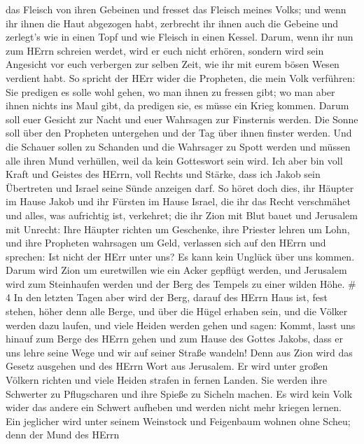 das Fleisch von ihren Gebeinen  und fresset das Fleisch
meines Volks; und wenn ihr ihnen die Haut abgezogen habt, zerbrecht ihr
ihnen auch die Gebeine und zerlegt's wie in einen Topf und wie Fleisch
in einen Kessel.  Darum, wenn ihr nun zum HErrn schreien
werdet, wird er euch nicht erhören, sondern wird sein Angesicht vor euch
verbergen zur selben Zeit, wie ihr mit eurem bösen Wesen verdient habt.
 So spricht der HErr wider die Propheten, die mein Volk
verführen: Sie predigen es solle wohl gehen, wo man ihnen zu fressen
gibt; wo man aber ihnen nichts ins Maul gibt, da predigen sie, es müsse
ein Krieg kommen.  Darum soll euer Gesicht zur Nacht und
euer Wahrsagen zur Finsternis werden. Die Sonne soll über den Propheten
untergehen und der Tag über ihnen finster werden.  Und die
Schauer sollen zu Schanden und die Wahrsager zu Spott werden und müssen
alle ihren Mund verhüllen, weil da kein Gotteswort sein wird.
 Ich aber bin voll Kraft und Geistes des HErrn, voll Rechts
und Stärke, dass ich Jakob sein Übertreten und Israel seine Sünde
anzeigen darf.  So höret doch dies, ihr Häupter im Hause
Jakob und ihr Fürsten im Hause Israel, die ihr das Recht verschmähet und
alles, was aufrichtig ist, verkehret;  die ihr Zion mit
Blut bauet und Jerusalem mit Unrecht:  Ihre Häupter richten
um Geschenke, ihre Priester lehren um Lohn, und ihre Propheten wahrsagen
um Geld, verlassen sich auf den HErrn und sprechen: Ist nicht der HErr
unter uns? Es kann kein Unglück über uns kommen.  Darum
wird Zion um euretwillen wie ein Acker gepflügt werden, und Jerusalem
wird zum Steinhaufen werden und der Berg des Tempels zu einer wilden
Höhe. \# 4  In den letzten Tagen aber wird der Berg, darauf
des HErrn Haus ist, fest stehen, höher denn alle Berge, und über die
Hügel erhaben sein, und die Völker werden dazu laufen,  und
viele Heiden werden gehen und sagen: Kommt, lasst uns hinauf zum Berge
des HErrn gehen und zum Hause des Gottes Jakobs, dass er uns lehre seine
Wege und wir auf seiner Straße wandeln! Denn aus Zion wird das Gesetz
ausgehen und des HErrn Wort aus Jerusalem.  Er wird unter
großen Völkern richten und viele Heiden strafen in fernen Landen. Sie
werden ihre Schwerter zu Pflugscharen und ihre Spieße zu Sicheln machen.
Es wird kein Volk wider das andere ein Schwert aufheben und werden nicht
mehr kriegen lernen.  Ein jeglicher wird unter seinem
Weinstock und Feigenbaum wohnen ohne Scheu; denn der Mund des HErrn

